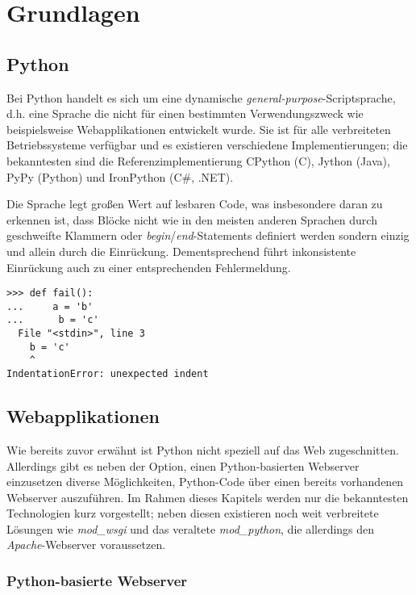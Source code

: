 \chapter{Grundlagen}

\section{Python}

Bei Python handelt es sich um eine dynamische \emph{general-purpose}-Scriptsprache, d.h. eine Sprache
die nicht für einen bestimmten Verwendungszweck wie beispielsweise Webapplikationen entwickelt
wurde. Sie ist für alle verbreiteten Betriebssysteme verfügbar und es existieren verschiedene
Implementierungen; die bekanntesten sind die Referenzimplementierung CPython (C), Jython (Java),
PyPy (Python) und IronPython (C\#, .NET).

Die Sprache legt großen Wert auf lesbaren Code, was insbesondere daran zu erkennen ist, dass Blöcke
nicht wie in den meisten anderen Sprachen durch geschweifte Klammern oder
\emph{begin}/\emph{end}-Statements definiert werden sondern einzig und allein durch die Einrückung.
Dementsprechend führt inkonsistente Einrückung auch zu einer entsprechenden Fehlermeldung.

\begin{lstlisting}[caption=Fehlerhafte Einrückung]
>>> def fail():
...     a = 'b'
...      b = 'c'
  File "<stdin>", line 3
    b = 'c'
    ^
IndentationError: unexpected indent
\end{lstlisting}


\section{Webapplikationen}

Wie bereits zuvor erwähnt ist Python nicht speziell auf das Web zugeschnitten. Allerdings gibt es
neben der Option, einen Python-basierten Webserver einzusetzen diverse Möglichkeiten, Python-Code
über einen bereits vorhandenen Webserver auszuführen. Im Rahmen dieses Kapitels werden nur die
bekanntesten Technologien kurz vorgestellt; neben diesen existieren noch weit verbreitete Lösungen
wie \emph{mod\_wsgi} und das veraltete \emph{mod\_python}, die allerdings den
\emph{Apache}-Webserver voraussetzen.

\subsection{Python-basierte Webserver}

